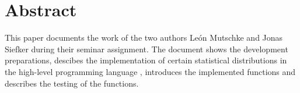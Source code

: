 
\chapter*{Abstract}

	This paper documents the work of the two authors Le\'{o}n Mutschke and Jonas Siefker during their seminar assignment. The document shows the development preparations, descibes the implementation of certain statistical distributions in the high-level programming language \setlx, introduces the implemented functions and describes the testing of the functions.
